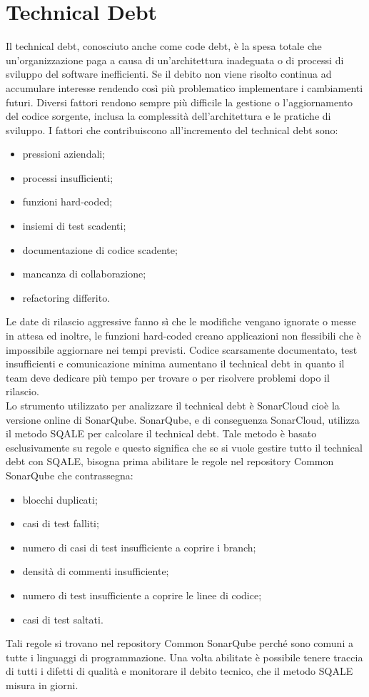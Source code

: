 \section{Technical Debt}
Il technical debt, conosciuto anche come code debt, è la spesa totale che un'organizzazione paga a causa di un'architettura inadeguata o di processi di sviluppo del software inefficienti. Se il debito non viene risolto continua ad accumulare interesse rendendo così più problematico implementare i cambiamenti futuri. Diversi fattori rendono sempre più difficile la gestione o l'aggiornamento del codice sorgente, inclusa la complessità dell'architettura e le pratiche di sviluppo. I fattori che contribuiscono all'incremento del technical debt sono:
\begin{itemize}
\item pressioni aziendali;
\item processi insufficienti;
\item funzioni hard-coded;
\item insiemi di test scadenti;
\item documentazione di codice scadente;
\item mancanza di collaborazione;
\item refactoring differito.
\end{itemize}
Le date di rilascio aggressive fanno sì che le modifiche vengano ignorate o messe in attesa ed inoltre, le funzioni hard-coded creano applicazioni non flessibili che è impossibile aggiornare nei tempi previsti. Codice scarsamente documentato, test insufficienti e comunicazione minima aumentano il technical debt in quanto il team deve dedicare più tempo per trovare o per risolvere problemi dopo il rilascio.\\ 
Lo strumento utilizzato per analizzare il technical debt è SonarCloud cioè la versione online di SonarQube. SonarQube, e di conseguenza SonarCloud, utilizza il metodo SQALE per calcolare il technical debt. Tale metodo è basato esclusivamente su regole e questo significa che se si vuole gestire tutto il technical debt con SQALE, bisogna prima abilitare le regole nel repository Common SonarQube che contrassegna:
\begin{itemize}
\item blocchi duplicati;
\item casi di test falliti;
\item numero di casi di test insufficiente a coprire i branch;
\item densità di commenti insufficiente;
\item numero di test insufficiente a coprire le linee di codice;
\item casi di test saltati.
\end{itemize}
Tali regole si trovano nel repository Common SonarQube perché sono comuni a tutte i linguaggi di programmazione. Una volta abilitate è possibile tenere traccia di tutti i difetti di qualità e monitorare il debito tecnico, che il metodo SQALE misura in giorni.

